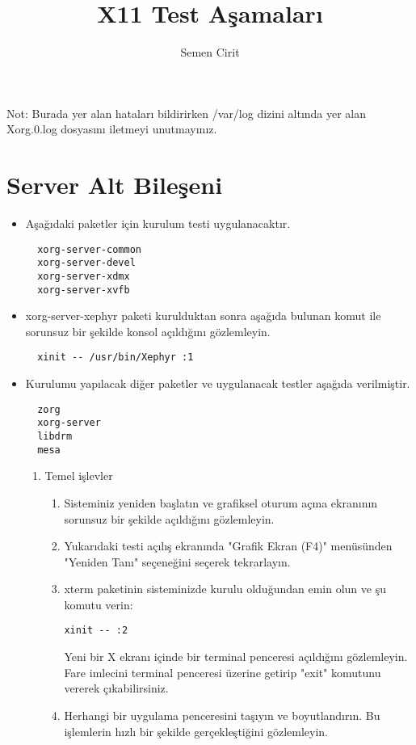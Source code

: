\documentclass[a4paper,10pt]{article}
\title{X11 Test Aşamaları}
\author{Semen Cirit}
\begin{document}
\maketitle

Not: Burada yer alan hataları bildirirken /var/log dizini altında yer alan Xorg.0.log
dosyasını iletmeyi unutmayınız.

\section{Server Alt Bileşeni}

\begin{itemize}
  \item Aşağıdaki paketler için kurulum testi uygulanacaktır.
  \begin{verbatim}
  xorg-server-common
  xorg-server-devel
  xorg-server-xdmx
  xorg-server-xvfb
  \end{verbatim}

  \item xorg-server-xephyr paketi kurulduktan sonra aşağıda bulunan komut ile sorunsuz bir şekilde konsol
  açıldığını gözlemleyin.
  \begin{verbatim}
  xinit -- /usr/bin/Xephyr :1
  \end{verbatim}

  \item Kurulumu yapılacak diğer paketler ve uygulanacak testler aşağıda verilmiştir.
  \begin{verbatim}
  zorg    
  xorg-server
  libdrm
  mesa
  \end{verbatim}


  \begin{enumerate}
  \item Temel işlevler
    \begin{enumerate}
    \item Sisteminiz yeniden başlatın ve grafiksel oturum açma ekranının sorunsuz bir şekilde açıldığını gözlemleyin.
    \item Yukarıdaki testi açılış ekranında "Grafik Ekran (F4)" menüsünden "Yeniden Tanı" seçeneğini seçerek tekrarlayın.
    \item xterm paketinin sisteminizde kurulu olduğundan emin olun ve şu komutu verin:
      \begin{verbatim}
xinit -- :2
      \end{verbatim}
      Yeni bir X ekranı içinde bir terminal penceresi açıldığını gözlemleyin. Fare imlecini terminal penceresi üzerine getirip "exit" komutunu vererek çıkabilirsiniz.
    \item Herhangi bir uygulama penceresini taşıyın ve boyutlandırın. Bu işlemlerin hızlı bir şekilde gerçekleştiğini gözlemleyin.
    \end{enumerate}


\end{enumerate}
\end{itemize}
\end{document}
